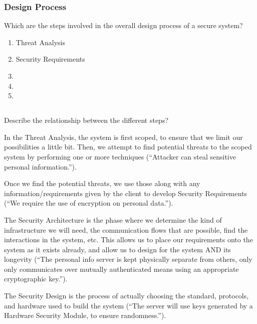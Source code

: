 \section{Design Process}\label{sec:Design_Process}
\begin{questions}
\question{} Which are the steps involved in the overall design process of a secure system?
  \begin{solution}
    \begin{enumerate}[noitemsep]
    \item Threat Analysis
    \item Security Requirements
    \item {}
    \item {}
    \item {}
    \end{enumerate}
  \end{solution}

  \begin{parts}
  \part{} Describe the relationship between the different steps?
    \begin{solution}
      In the Threat Analysis, the system is first scoped, to ensure that we limit our possibilities a little bit.
      Then, we attempt to find potential threats to the scoped system by performing one or more techniques (``Attacker can steal sensitive personal information.'').

      Once we find the potential threats, we use those along with any information/requirements given by the client to develop Security Requirements (``We require the use of encryption on personal data.'').

      The Security Architecture is the phase where we determine the kind of infrastructure we will need, the communication flows that are possible, find the interactions in the system, etc.
      This allows us to place our requirements onto the system as it exists already, and allow us to design for the system AND its longevity (``The personal info server is kept physically separate from others, only only communicates over mutually authenticated means using an appropriate cryptographic key.'').

      The Security Design is the process of actually choosing the standard, protocols, and hardware used to build the system (``The server will use keys generated by a Hardware Security Module, to ensure randomness.'').


\end{solution}
\end{parts}
\end{questions}
